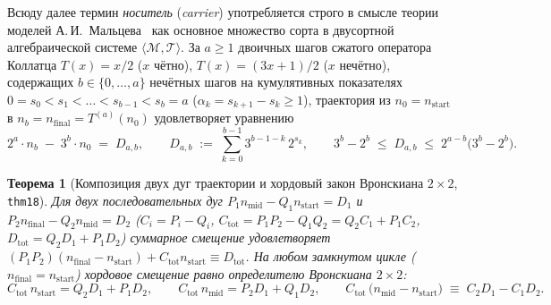 \documentclass[11pt,a4paper]{article}
\newtheorem{theorem}{Теорема}[section]
\theoremstyle{definition}
\theoremstyle{remark}
\begin{document}
Всюду далее термин \emph{носитель} (\emph{carrier}) употребляется строго в смысле теории моделей А.\,И.~Мальцева~\cite{Malcev1970} как основное множество сорта в двусортной алгебраической системе $\langle\mathcal{M},\mathcal{T}\rangle$. За $a \ge 1$ двоичных шагов сжатого оператора Коллатца $T(x) = x/2$ ($x$ чётно), $T(x) = (3x+1)/2$ ($x$ нечётно), содержащих $b \in \{0,\dots,a\}$ нечётных шагов на кумулятивных показателях $0 = s_0 < s_1 < \dots < s_{b-1} < s_b = a$ ($\alpha_k = s_{k+1} - s_k \ge 1$), траектория из $n_0 = n_{\mathrm{start}}$ в $n_b = n_{\mathrm{final}} = T^{(a)}(n_0)$ удовлетворяет уравнению
\begin{equation}
  \label{eq:collatz-equation-of-motion}
  2^a \cdot n_b \;-\; 3^b \cdot n_0 \;=\; D_{a,b}, \qquad
  D_{a,b} \;:=\; \sum_{k=0}^{b-1} 3^{b-1-k}\,2^{s_k}, \qquad
  3^b - 2^b \;\le\; D_{a,b} \;\le\; 2^{a-b}\bigl(3^b - 2^b\bigr).
\end{equation}

\begin{theorem}[Композиция двух дуг траектории и хордовый закон Вронскиана $2\times 2$, \texttt{thm18}]
\label{thm:two-arc-wronskian}
Для двух последовательных дуг $P_1 n_{\mathrm{mid}} - Q_1 n_{\mathrm{start}} = D_1$ и $P_2 n_{\mathrm{final}} - Q_2 n_{\mathrm{mid}} = D_2$ ($C_i = P_i - Q_i$, $C_{\mathrm{tot}} = P_1 P_2 - Q_1 Q_2 = Q_2 C_1 + P_1 C_2$, $D_{\mathrm{tot}} = Q_2 D_1 + P_1 D_2$) суммарное смещение удовлетворяет $(P_1 P_2)(n_{\mathrm{final}} - n_{\mathrm{start}}) + C_{\mathrm{tot}} n_{\mathrm{start}} \equiv D_{\mathrm{tot}}$. На любом замкнутом цикле ($n_{\mathrm{final}} = n_{\mathrm{start}}$) хордовое смещение равно определителю Вронскиана $2\times 2$:
\begin{equation}
  \label{eq:cycle-wronskian-chord}
  C_{\mathrm{tot}}\,n_{\mathrm{start}} = Q_2 D_1 + P_1 D_2, \qquad
  C_{\mathrm{tot}}\,n_{\mathrm{mid}} = P_2 D_1 + Q_1 D_2, \qquad
  C_{\mathrm{tot}}\,\bigl(n_{\mathrm{mid}} - n_{\mathrm{start}}\bigr) \;\equiv\; C_2 D_1 - C_1 D_2.
\end{equation}
\end{theorem}
\end{document}
